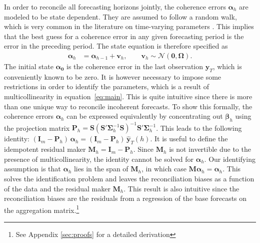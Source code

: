 \documentclass[a4paper,fleqn,11pt]{article}
\begin{document}
In order to reconcile all forecasting horizons jointly, the coherence errors $\boldsymbol{\alpha}_h$ are modeled to be state dependent. They are assumed to follow a random walk, which is very common in the literature on time-varying parameters \citep[see for instance][and references therein]{Primiceri2005}. This implies that the best guess for a coherence error in any given forecasting period is the error in the preceding period. The state equation is therefore specified as
\begin{align}
	\label{eq:state}
	\boldsymbol{\alpha}_h & = \boldsymbol{\alpha}_{h-1} + \textbf{v}_h, \qquad \textbf{v}_h \sim \mathcal{N}(\textbf{0}, \boldsymbol{\Omega}).
\end{align}
The initial state $\boldsymbol{\alpha_0}$ is the coherence error in the last observation $\textbf{y}_{T}$, which is conveniently known to be zero. It is however necessary to impose some restrictions in order to identify the parameters, which is a result of multicollinearity in equation~\eqref{eq:main}. This is quite intuitive since there is more than one unique way to reconcile incoherent forecasts. To show this formally, the coherence errors $\boldsymbol{\alpha}_h$ can be expressed equivalently by concentrating out $\boldsymbol{\beta}_h$ using the projection matrix $\textbf{P}_h = \textbf{S}(\textbf{S}'\boldsymbol{\Sigma}_h^{-1} \textbf{S})^{-1}\textbf{S}'\boldsymbol{\Sigma}_h^{-1}$. This leads to the following identity: $(\textbf{I}_m - \textbf{P}_h)\, \boldsymbol{\alpha}_h = (\textbf{I}_m - \textbf{P}_h)\, \mathbf{\hat{y}}_{T}(h).$ It is useful to define the idempotent residual maker $\textbf{M}_h = \textbf{I}_m - \textbf{P}_h$. Since $\textbf{M}_h$ is not invertible due to the presence of multicollinearity, the identity cannot be solved for $\boldsymbol{\alpha}_h$. Our identifying assumption is that $\boldsymbol{\alpha}_h$ lies in the span of $\textbf{M}_h$, in which case $\textbf{M}\boldsymbol{\alpha}_h = \boldsymbol{\alpha}_h$. This solves the identification problem and leaves the reconciliation biases as a function of the data and the residual maker $\textbf{M}_h$. This result is also intuitive since the reconciliation biases are the residuals from a regression of the base forecasts on the aggregation matrix.\footnote{See Appendix \ref{sec:proofs} for a detailed derivation}
\end{document}
